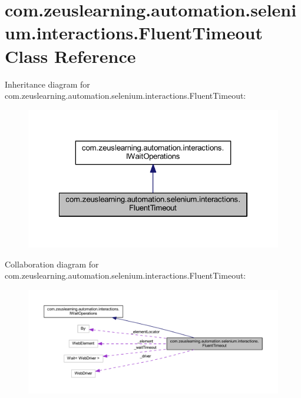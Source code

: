 \hypertarget{classcom_1_1zeuslearning_1_1automation_1_1selenium_1_1interactions_1_1FluentTimeout}{}\section{com.\+zeuslearning.\+automation.\+selenium.\+interactions.\+Fluent\+Timeout Class Reference}
\label{classcom_1_1zeuslearning_1_1automation_1_1selenium_1_1interactions_1_1FluentTimeout}


Inheritance diagram for com.\+zeuslearning.\+automation.\+selenium.\+interactions.\+Fluent\+Timeout\+:
\nopagebreak
\begin{figure}[H]
\begin{center}
\leavevmode
\includegraphics[width=322pt]{d0/df4/classcom_1_1zeuslearning_1_1automation_1_1selenium_1_1interactions_1_1FluentTimeout__inherit__graph}
\end{center}
\end{figure}


Collaboration diagram for com.\+zeuslearning.\+automation.\+selenium.\+interactions.\+Fluent\+Timeout\+:
\nopagebreak
\begin{figure}[H]
\begin{center}
\leavevmode
\includegraphics[width=350pt]{db/db3/classcom_1_1zeuslearning_1_1automation_1_1selenium_1_1interactions_1_1FluentTimeout__coll__graph}
\end{center}
\end{figure}
